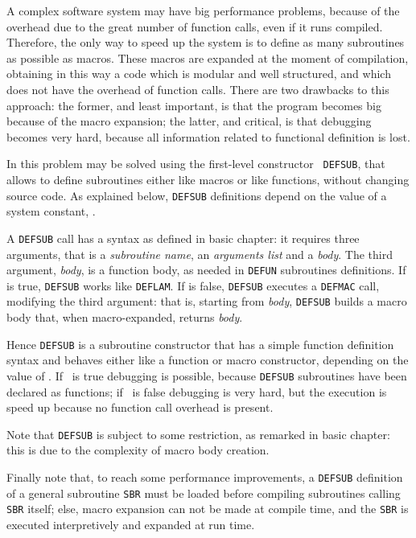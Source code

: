 A complex software system may have big performance problems, because of the
overhead due to the great number of function calls, even if it runs compiled.
Therefore, the only way to speed up the system is to define as many subroutines
as possible as macros. These macros are expanded at the moment of compilation,
obtaining in this way a code which is modular and well structured, and which
does not have the overhead of function calls.
There are two drawbacks to this approach: the former, and least important, is
that the program becomes big because of the macro expansion; the latter, and
critical, is that debugging becomes very hard, because all information related
to functional definition is lost.

In {\HG} this problem may be solved using the first-level constructor {\tt
DEFSUB}, that allows to define subroutines either like macros or like functions,
without changing source code.
As explained below, {\tt DEFSUB} definitions depend on the value of a system
constant, {\tt \debmode}.

A {\tt DEFSUB} call has a syntax as defined in basic {\HG} chapter: it requires
three arguments, that is a {\it subroutine name}, an {\it arguments list} and a
{\it body}.
The third argument, {\it body}, is a function body, as needed in {\tt DEFUN}
subroutines definitions.
If {\tt \debmode} is true, {\tt DEFSUB} works like {\tt DEFLAM}.
If {\tt \debmode} is false, {\tt DEFSUB} executes a {\tt DEFMAC} call, modifying
the third argument: that is, starting from {\it body}, {\tt DEFSUB} builds a
macro body that, when macro-expanded, returns {\it body}.

Hence {\tt DEFSUB} is a subroutine constructor that has a simple function
definition syntax and behaves either like a function or macro constructor,
depending on the value of {\tt \debmode}.
If {\tt \debmode}\ is true debugging is possible, because {\tt DEFSUB}
subroutines have been declared as functions; if {\tt \debmode}\ is false
debugging is very hard, but the execution is speed up because no function call
overhead is present.

Note that {\tt DEFSUB} is subject to some restriction, as remarked in basic
{\HG} chapter: this is due to the complexity of macro body creation.

Finally note that, to reach some performance improvements, a {\tt DEFSUB}
definition of a general subroutine {\tt SBR} must be loaded before compiling
subroutines calling {\tt SBR} itself; else, macro expansion can not be made at
compile time, and the {\tt SBR} is executed interpretively and expanded at run
time.








